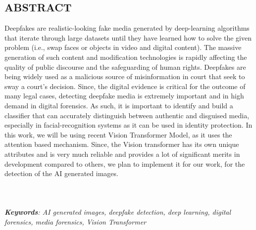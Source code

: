 \begin{center}


    \section*{ABSTRACT}
    \justify
    Deepfakes are realistic-looking fake media generated by deep-learning algorithms that iterate through large datasets until
    they have learned how to solve the given problem (i.e., swap faces or objects in video and digital content). The massive generation
    of such content and modification technologies is rapidly affecting the quality of public discourse and the safeguarding of
    human rights. Deepfakes are being widely used as a malicious source of misinformation in court that seek to sway a court’s decision.
    Since, the digital evidence is critical for the outcome of many legal cases, detecting deepfake media is extremely important and in high demand in digital forensics.
    As such, it is important to identify and build a classifier that can accurately distinguish between authentic and disguised media, especially in facial-recognition systems
    as it can be used in identity protection. In this work,
    we will be using recent Vision Transformer Model, as it uses the attention based mechanism. Since, the Vision transformer has its own unique attributes and is very much reliable and provides a lot of significant merits in development compared to others, we plan to implement it for our work, for the detection of the AI generated images.\\
    \\
    \\
    \\ \textit{\textbf{Keywords}: AI generated images, deepfake detection, deep learning, digital forensics, media forensics, Vision Transformer }


\end{center}